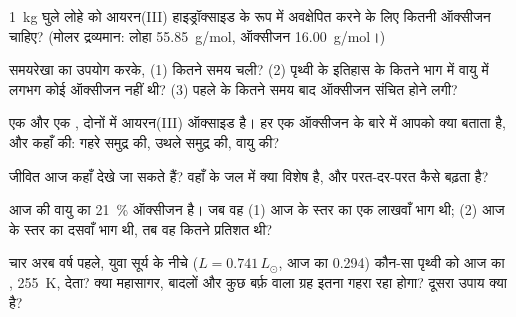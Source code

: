 \begin{exercise}[$\star\star$]\label{exo:g12:early-earth:7}
\qty{1}{kg} घुले लोहे को आयरन(III) हाइड्रॉक्साइड के रूप में अवक्षेपित करने के लिए
कितनी ऑक्सीजन चाहिए? (मोलर द्रव्यमान: लोहा \qty{55.85}{g/mol}, ऑक्सीजन
\qty{16.00}{g/mol}।)
\end{exercise}

\begin{exercise}[$\star\star$]\label{exo:g12:early-earth:8}
समयरेखा का उपयोग करके, (1)  कितने समय चली? (2)
पृथ्वी के इतिहास के कितने भाग में वायु में लगभग कोई ऑक्सीजन नहीं
थी? (3) पहले  के कितने समय बाद ऑक्सीजन संचित होने लगी?
\end{exercise}

\begin{exercise}[$\star\star$]\label{exo:g12:early-earth:9}
एक  और एक , दोनों में आयरन(III) ऑक्साइड है। हर एक
ऑक्सीजन के बारे में आपको क्या बताता है, और कहाँ की: गहरे समुद्र की, उथले
समुद्र की, वायु की?
\end{exercise}

\begin{exercise}[$\star\star$]\label{exo:g12:early-earth:10}
जीवित  आज कहाँ देखे जा सकते हैं? वहाँ के जल में क्या विशेष
है, और  परत-दर-परत कैसे बढ़ता है?
\end{exercise}

\begin{exercise}[$\star\star$]\label{exo:g12:early-earth:11}
आज की वायु का \qty{21}{\percent} ऑक्सीजन है। जब वह (1) आज के स्तर का
एक लाखवाँ भाग थी; (2) आज के स्तर का दसवाँ भाग थी, तब वह कितने प्रतिशत थी?
\end{exercise}

\begin{exercise}[$\star\star\star$]\label{exo:g12:early-earth:12}
चार अरब वर्ष पहले, युवा सूर्य के नीचे ($L = 0.741\,L_\odot$,
आज का  0.294) कौन-सा  पृथ्वी को आज का ,
\qty{255}{K}, देता? क्या महासागर, बादलों और कुछ बर्फ़ वाला ग्रह
इतना गहरा रहा होगा? दूसरा उपाय क्या है?
\end{exercise}

